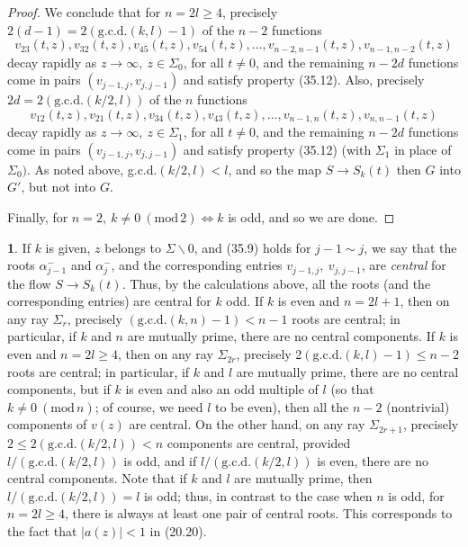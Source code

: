 \documentclass{surv-l}
\theoremstyle{plain}
\theoremstyle{definition}
\newtheorem{remark}[theorem]{\sc{Remark}}
\numberwithin{equation}{chapter}
\begin{document}
\begin{proof}
We conclude that for $n=2l\geq 4$, precisely $2(d-1)=2(\mathrm{g.c.d.}(k, l)-1)$ of the $n-2$ functions
\begin{equation*}
v_{23}(t, z), v_{32}(t, z), v_{45}(t, z),v_{54}(t, z),\ldots,v_{n-2,n-1}(t,z),v_{n-1,n-2}(t, z)
\end{equation*}
decay rapidly as $ z\rightarrow\infty,\ z\in\Sigma_{0}$, for all $t\neq 0$, and the remaining $n-2d$ functions come in pairs $(v_{j-1,j},v_{j,j-1})$ and satisfy property (35.12). Also, precisely $2d= 2(\mathrm{g.c.d.}(k/2,l))$ of the $n$ functions
\begin{equation*}
v_{12}(t, z),v_{21}(t, z),v_{34}(t, z),v_{43}(t, z),\ldots,v_{n-1,n}(t, z),v_{n,n-1}(t, z)
\end{equation*}
decay rapidly as $ z\rightarrow\infty,\ z\in\Sigma_{1}$, for all $t\neq 0$, and the remaining $n-2d$ functions come in pairs $(v_{j-1,j}, v_{j,j-1})$ and satisfy property (35.12) (with $\Sigma_{1}$ in place of $\Sigma_{0})$. As noted above, g.c.d.$(k/2, l)<l$, and so the map $S\rightarrow S_{k}(t)$ then $G$ into $G'$, but not into $G$.

Finally, for $n=2,\ k\neq 0\ (\mathrm{mod}\, 2)\Leftrightarrow k$ is odd, and so we are done.\quad
\end{proof}
\setcounter{theorem}{16}
\begin{remark}\label{rem35.17}
If $k$ is given, $z$ belongs to $\Sigma\backslash 0$, and (35.9) holds for $j-1\sim j$, we say that the roots $\alpha_{j-1}^{-}$ and $\alpha_{j}^{-}$, and the corresponding entries $v_{j-1,j},\ v_{j,j-1}$, are \emph{central} for the flow $S\rightarrow S_{k}(t)$. Thus, by the calculations above, all the roots (and the corresponding entries) are central for $k$ odd. If $k$ is even and $n=2l+1$, then on any ray $\Sigma_{r}$, precisely $(\mathrm{g.c.d.}(k, n)-1)<n-1$ roots are central; in particular, if $k$ and $n$ are mutually prime, there are no central components. If $k$ is even and $n=2l\geq 4$, then on any ray $\Sigma_{2r}$, precisely 2$(\mathrm{g.c.d.}(k, l) -1)\leq n-2$ roots are central; in particular, if $k$ and $l$ are mutually prime, there are no central components, but if $k$ is even and also an odd multiple of $l$ (so that $k\neq 0\ (\mathrm{mod}\, n)$; of course, we need $l$ to be even), then all the $n-2$ (nontrivial) components of $v(z)$ are central. On the other hand, on any ray $\Sigma_{2r+1}$, precisely $2\leq 2(\mathrm{g.c.d.}(k/2,l))<n$ components are central, provided $l/(\mathrm{g.c.d.}(k/2,l))$ is odd, and if $l/(\mathrm{g.c.d.}(k/2,l))$ is even, there are no central components. Note that if $k$ and $l$ are mutually prime, then $l/(\mathrm{g.c.d.}(k/2, l))=l$ is odd; thus, in contrast to the case when $n$ is odd, for $n=2l\geq 4$, there is always at least one pair of central roots. This corresponds to the fact that $|a(z)|<1$ in (20.20).
\end{remark}
\end{document}
